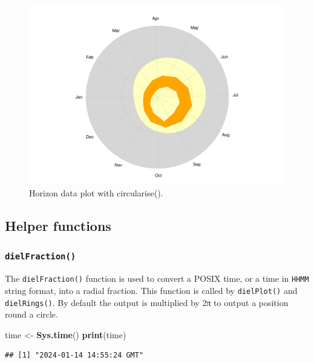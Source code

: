 \documentclass[
]{book}
\newenvironment{Shaded}{\begin{snugshade}}{\end{snugshade}}
\newcommand{\FunctionTok}[1]{\textcolor[rgb]{0.13,0.29,0.53}{\textbf{#1}}}
\newcommand{\NormalTok}[1]{#1}
\newcommand{\OtherTok}[1]{\textcolor[rgb]{0.56,0.35,0.01}{#1}}
\begin{document}
\begin{figure}

{\centering \includegraphics[width=0.9\linewidth]{_main_files/figure-latex/lyme-temp-2-1} 

}

\caption{Horizon data plot with circularise().}\label{fig:lyme-temp-2}
\end{figure}

\hypertarget{helper-functions}{%
\subsection{Helper functions}\label{helper-functions}}

\hypertarget{dielfraction}{%
\subsubsection{\texorpdfstring{\texttt{dielFraction()}}{dielFraction()}}\label{dielfraction}}

The \texttt{dielFraction()} function is used to convert a POSIX time, or a time in \texttt{HHMM} string format, into a radial fraction. This function is called by \texttt{dielPlot()} and \texttt{dielRings()}. By default the output is multiplied by 2π to output a position round a circle.

\begin{Shaded}
\begin{Highlighting}[]
\NormalTok{time }\OtherTok{\textless{}{-}} \FunctionTok{Sys.time}\NormalTok{()}
\FunctionTok{print}\NormalTok{(time)}
\end{Highlighting}
\end{Shaded}

\begin{verbatim}
## [1] "2024-01-14 14:55:24 GMT"
\end{verbatim}
\end{document}

